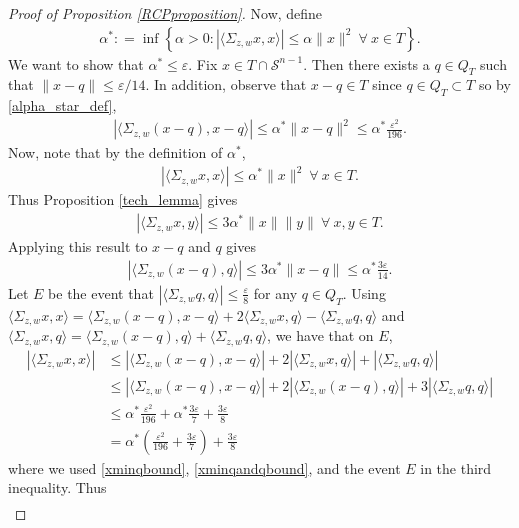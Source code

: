 \documentclass[11pt]{article}
\renewcommand{\epsilon}{\varepsilon}
\newcommand{\al}{\alpha}
\theoremstyle{remark}
\begin{document}
\begin{proof}[Proof of Proposition \ref{RCPproposition}]
Now, define \begin{align}
\al^* : = \inf\left\{\al > 0 : |\langle \Sigma_{z,w} x,x\rangle| \leqslant \al\|x\|^2\ \forall\ x \in T\right\}. \label{alpha_star_def}
\end{align} We want to show that $\al^* \leqslant \epsilon$. Fix $x \in T \cap \mathcal{S}^{n-1}$. Then there exists a $q \in Q_T$ such that $\|x - q \| \leqslant \epsilon/14.$ In addition, observe that $x - q \in T$ since $q \in Q_T \subset T$ so by \eqref{alpha_star_def}, \begin{align} \label{xminqbound}
|\langle \Sigma_{z,w}(x-q),x-q\rangle| \leqslant \al^*\|x-q\|^2 \leqslant \al^*\frac{\epsilon^2}{196}.
\end{align} Now, note that by the definition of $\al^*$, \begin{align*}
|\langle \Sigma_{z,w} x, x \rangle| \leqslant \al^*\|x\|^2\ \forall\ x \in T.
\end{align*} Thus Proposition \ref{tech_lemma} gives \begin{align*}
|\langle \Sigma_{z,w} x, y \rangle| \leqslant 3\al^*\|x\|\|y\|\ \forall\ x,y \in T.
\end{align*} Applying this result to $x-q$ and $q$ gives \begin{align} \label{xminqandqbound}
|\langle \Sigma_{z,w} (x-q), q \rangle| \leqslant 3\al^*\|x- q\| \leqslant \al^*\frac{3\epsilon}{14}.
\end{align} Let $E$ be the event that $|\langle \Sigma_{z,w} q,q \rangle| \leqslant \frac{\epsilon}{8}$ for any $q \in Q_T$. Using $\langle \Sigma_{z,w} x,x \rangle = \langle \Sigma_{z,w}(x-q),x-q \rangle + 2\langle \Sigma_{z,w} x,q \rangle - \langle \Sigma_{z,w} q, q \rangle$ and $\langle \Sigma_{z,w} x,q \rangle = \langle \Sigma_{z,w} (x-q),q\rangle + \langle \Sigma_{z,w} q,q \rangle$, we have that on $E$, \begin{align*}
|\langle \Sigma_{z,w} x,x \rangle| & \leqslant |\langle \Sigma_{z,w}(x-q),x-q\rangle| + 2|\langle \Sigma_{z,w} x,q\rangle| + |\langle \Sigma_{z,w} q,q\rangle| \\
& \leqslant |\langle \Sigma_{z,w}(x-q),x-q\rangle| + 2|\langle \Sigma_{z,w} (x-q),q\rangle| + 3|\langle \Sigma_{z,w}q,q\rangle| \\
& \leqslant \al^* \frac{\epsilon^2}{196} + \al^*\frac{3\epsilon}{7} + \frac{3\epsilon}{8} \\
& = \al^*\left(\frac{\epsilon^2}{196} + \frac{3\epsilon}{7}\right) + \frac{3\epsilon}{8}
\end{align*} where we used \eqref{xminqbound}, \eqref{xminqandqbound}, and the event $E$ in the third inequality. Thus \begin{align}

\end{align}
\end{proof}
\end{document}
